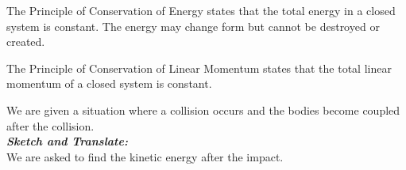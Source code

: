 %
%
%


\begin{subquestions}

\subquestion

\begin{subsubquestions}
	
\subsubquestion

The Principle of Conservation of Energy states that the total energy in a closed system is constant. The energy may change form but cannot be destroyed or created.\\ 

\subsubquestion

The Principle of Conservation of Linear Momentum states that the total linear momentum of a closed system is constant.

\end{subsubquestions}


\begin{subsubquestions}
	
\subsubquestion

We are given a situation where a collision occurs and the bodies become coupled after the collision.\\

\textbf{\textit{Sketch and Translate:}} \\
We are asked to find the kinetic energy after the impact. \\




\end{subsubquestions}
\end{subquestions}

